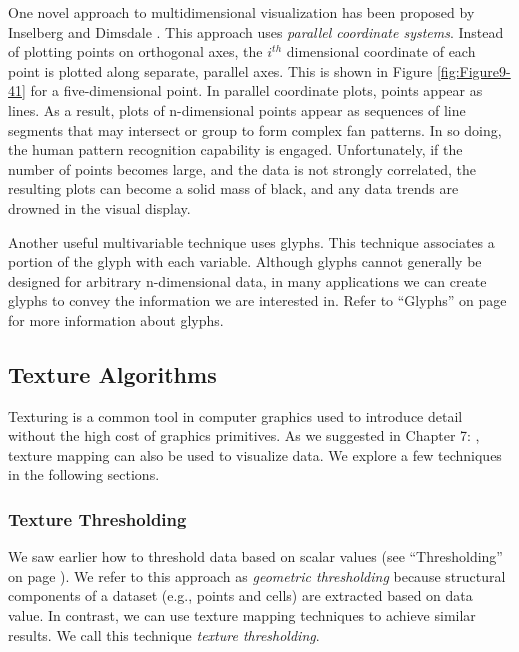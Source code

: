 One novel approach to multidimensional visualization has been proposed by Inselberg and Dimsdale \cite{Inselberg87}. This approach uses \emph{parallel coordinate systems}. Instead of plotting points on orthogonal axes, the $i^{th}$ dimensional coordinate of each point is plotted along separate, parallel axes. This is shown in Figure \ref{fig:Figure9-41} for a five-dimensional point. In parallel coordinate plots, points appear as lines. As a result, plots of n-dimensional points appear as sequences of line segments that may intersect or group to form complex fan patterns. In so doing, the human pattern recognition capability is engaged. Unfortunately, if the number of points becomes large, and the data is not strongly correlated, the resulting plots can become a solid mass of black, and any data trends are drowned in the visual display.

Another useful multivariable technique uses glyphs. This technique associates a portion of the glyph with each variable. Although glyphs cannot generally be designed for arbitrary n-dimensional data, in many applications we can create glyphs to convey the information we are interested in. Refer to ``Glyphs'' on page \pageref{subsec:glyphs} for more information about glyphs.

\subsection{Texture Algorithms}
\label{subsec:texture_algorithms}

Texturing is a common tool in computer graphics used to introduce detail without the high cost of graphics primitives. As we suggested in Chapter 7: , texture mapping can also be used to visualize data. We explore a few techniques in the following sections.

\subsubsection{Texture Thresholding}

We saw earlier how to threshold data based on scalar values (see ``Thresholding'' on page \pageref{subsubsec:thresholding}). We refer to this approach as \emph{geometric thresholding} because structural components of a dataset (e.g., points and cells) are extracted based on data value. In contrast, we can use texture mapping techniques to achieve similar results. We call this technique \emph{texture thresholding}.

